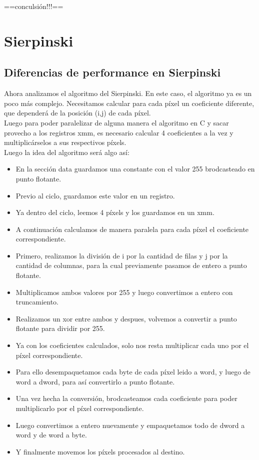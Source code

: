 \documentclass[a4paper]{article}
\begin{document}
==conculsión!!!==

\newpage
\section{Sierpinski}
\subsection{Diferencias de performance en Sierpinski}
Ahora analizamos el algoritmo del Sierpinski. En este caso, el algoritmo ya es un poco más complejo. Necesitamos calcular para cada píxel un coeficiente diferente, que dependerá de la posición (i,j) de cada píxel.
\\
Luego para poder paralelizar de alguna manera el algoritmo en C y sacar provecho a los registros xmm, es necesario calcular 4 coeficientes a la vez y multiplicárselos a sus respectivos píxels.
\\
Luego la idea del algoritmo será algo así:

\begin{itemize}
\item En la sección data guardamos una constante con el valor 255 brodcasteado en punto flotante.
\item Previo al ciclo, guardamos este valor en un registro.
\item Ya dentro del ciclo, leemos 4 píxels y los guardamos en un xmm.
\item A continuación calculamos de manera paralela para cada píxel el coeficiente correspondiente.
\item Primero, realizamos la división de i por la cantidad de filas y j por la cantidad de columnas, para la cual previamente pasamos de entero a punto flotante.
\item Multiplicamos ambos valores por 255 y luego convertimos a entero con truncamiento.
\item Realizamos un xor entre ambos y despues, volvemos a convertir a punto flotante para dividir por 255.
\item Ya con los coeficientes calculados, solo nos resta multiplicar cada uno por el píxel correspondiente.
\item Para ello desempaquetamos cada byte de cada píxel leido a word, y luego de word a dword, para así convertirlo a punto flotante.
\item Una vez hecha la conversión, brodcasteamos cada coeficiente para poder multiplicarlo por el píxel correspondiente.
\item Luego convertimos a entero nuevamente y empaquetamos todo de dword a word y de word a byte.
\item Y finalmente movemos los píxels procesados al destino.
\end{itemize}
\end{document}
